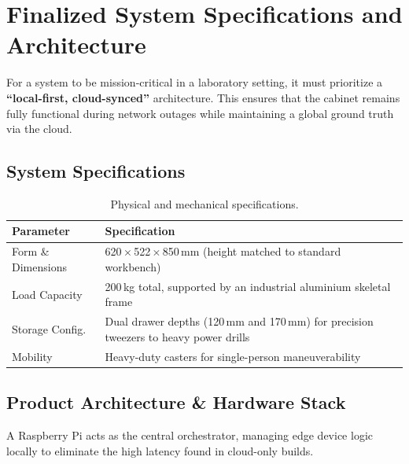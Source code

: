 \documentclass[12pt, a4paper]{article}
\begin{document}
\section{Finalized System Specifications and Architecture}
\label{sec:specs}

For a system to be mission-critical in a laboratory setting, it must prioritize a \textbf{``local-first, cloud-synced''} architecture.
This ensures that the cabinet remains fully functional during network outages while maintaining a global ground truth via the cloud.

\subsection{System Specifications}

\begin{table}[H]
\centering
\caption{Physical and mechanical specifications.}
\begin{tabularx}{\textwidth}{lX}
\toprule
\textbf{Parameter} & \textbf{Specification} \\
\midrule
Form \& Dimensions & 620\,$\times$\,522\,$\times$\,850\,mm (height matched to standard workbench) \\
Load Capacity      & 200\,kg total, supported by an industrial aluminium skeletal frame \\
Storage Config.    & Dual drawer depths (120\,mm and 170\,mm) for precision tweezers to heavy power drills \\
Mobility           & Heavy-duty casters for single-person maneuverability \\
\bottomrule
\end{tabularx}
\end{table}

\subsection{Product Architecture \& Hardware Stack}

A Raspberry Pi acts as the central orchestrator, managing edge device logic locally to eliminate the high latency found in cloud-only builds.
\end{document}
